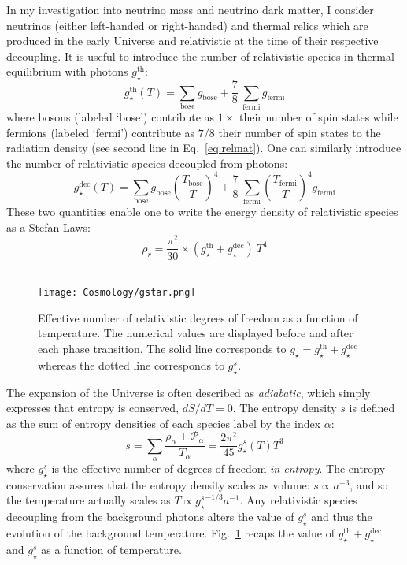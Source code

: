 In my investigation into neutrino mass and neutrino dark matter, I consider neutrinos (either left-handed or right-handed) and thermal relics which are produced in the early Universe and relativistic at the time of their respective decoupling. It is useful to introduce the number of relativistic species in thermal equilibrium with photons $g_\star^{\mathrm{th}}$:
\begin{equation}
g_{\star}^{\mathrm{th}} (T) = \sum_{\mathrm{bose}} g_{\mathrm{bose}} + \frac{7}{8} ~\sum_{\mathrm{fermi}} g_{\mathrm{fermi}}
\end{equation} where bosons (labeled `bose') contribute as $1 \times$ their number of spin states while fermions (labeled `fermi') contribute as $7/8$ their number of spin states to the radiation density (see second line in Eq.~\ref{eq:relmat}). One can similarly introduce the number of relativistic species decoupled from photons:
\begin{equation}
g_{\star}^{\mathrm{dec}} (T) = \sum_{\mathrm{bose}} g_{\mathrm{bose}} \left( \frac{T_{\mathrm{bose}}}{T} \right)^4 + \frac{7}{8} ~\sum_{\mathrm{fermi}} \left( \frac{T_{\mathrm{fermi}}}{T} \right)^4 g_{\mathrm{fermi}}
\end{equation} These two quantities enable one to write the energy density of relativistic species as a Stefan Laws:
\begin{equation}
\rho_r = \frac{\pi^2}{30} \times \left( g_{\star}^{\mathrm{th}} + g_{\star}^{\mathrm{dec}} \right)~T^4
\end{equation} \\

\begin{figure}
\begin{center}
\texttt{[image: Cosmology/gstar.png]}
\end{center}
\caption{Effective number of relativistic degrees of freedom as a function of temperature. The numerical values are displayed before and after each phase transition. The solid line corresponds to $g_\star = g_{\star}^{\mathrm{th}} + g_{\star}^{\mathrm{dec}}$ whereas the dotted line corresponds to $g^s_{\star}$.}
\label{fig:gstar}
\end{figure}

The expansion of the Universe is often described as \emph{adiabatic}, which simply expresses that entropy is conserved, $dS / dT = 0$. The entropy density $s$ is defined as the sum of entropy densities of each species label by the index $\alpha$:
\begin{equation}
\label{eq:entropydensity}
s = \sum_{\alpha} \frac{\rho_{\alpha} + \mathcal{P}_{\alpha}}{T_{\alpha}} = \frac{2 \pi^2}{45} g^s_{\star} (T) T^3
\end{equation} where $g^s_{\star}$ is the effective number of degrees of freedom \emph{in entropy}. The entropy conservation assures that the entropy density scales as volume: $s \propto a^{-3}$, and so the temperature actually scales as $T \propto {g^s_\star}^{-1/3} a^{-1}$. Any relativistic species decoupling from the background photons alters the value of $g^s_\star$ and thus the evolution of the background temperature. Fig.~\ref{fig:gstar} recaps the value of $g_{\star}^{\mathrm{th}} + g_{\star}^{\mathrm{dec}}$ and $g^s_{\star}$ as a function of temperature.

\clearpage

